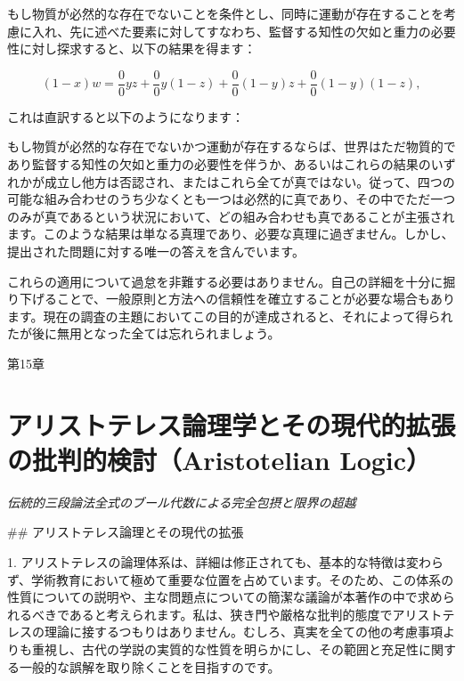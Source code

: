 \documentclass[a4paper,11pt,openany]{ltjsbook}
\begin{document}
もし物質が必然的な存在でないことを条件とし、同時に運動が存在することを考慮に入れ、先に述べた要素に対してすなわち、監督する知性の欠如と重力の必要性に対し探求すると、以下の結果を得ます：

\begin{equation*}
(1-x)w = \frac{0}{0}yz + \frac{0}{0}y(1-z) + \frac{0}{0}(1-y)z + \frac{0}{0}(1-y)(1-z),
\end{equation*}

これは直訳すると以下のようになります：

もし物質が必然的な存在でないかつ運動が存在するならば、世界はただ物質的であり監督する知性の欠如と重力の必要性を伴うか、あるいはこれらの結果のいずれかが成立し他方は否認され、またはこれら全てが真ではない。従って、四つの可能な組み合わせのうち少なくとも一つは必然的に真であり、その中でただ一つのみが真であるという状況において、どの組み合わせも真であることが主張されます。このような結果は単なる真理であり、必要な真理に過ぎません。しかし、提出された問題に対する唯一の答えを含んでいます。

これらの適用について過怠を非難する必要はありません。自己の詳細を十分に掘り下げることで、一般原則と方法への信頼性を確立することが必要な場合もあります。現在の調査の主題においてこの目的が達成されると、それによって得られたが後に無用となった全ては忘れられましょう。

第15章

\newpage

\chapter{アリストテレス論理学とその現代的拡張の批判的検討（Aristotelian Logic）}
\label{ch:xv}

\begin{center}
\large\textit{伝統的三段論法全式のブール代数による完全包摂と限界の超越}
\end{center}
\vspace{4mm}

\#\# アリストテレス論理とその現代の拡張

1. アリストテレスの論理体系は、詳細は修正されても、基本的な特徴は変わらず、学術教育において極めて重要な位置を占めています。そのため、この体系の性質についての説明や、主な問題点についての簡潔な議論が本著作の中で求められるべきであると考えられます。私は、狭き門や厳格な批判的態度でアリストテレスの理論に接するつもりはありません。むしろ、真実を全ての他の考慮事項よりも重視し、古代の学説の実質的な性質を明らかにし、その範囲と充足性に関する一般的な誤解を取り除くことを目指すのです。
\end{document}
